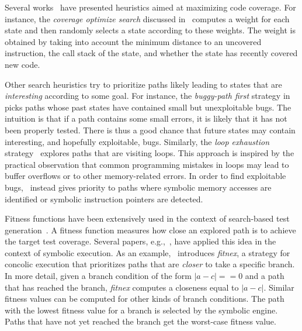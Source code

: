 Several works~\cite{EXE-CCS06,KLEE-OSDI08,MAYHEM-SP12,CKC-TOCS12} have presented heuristics aimed at maximizing code coverage. For instance, the {\em coverage optimize search} discussed in~\cite{KLEE-OSDI08} computes a weight for each state and then randomly selects a state according to these weights. The weight is obtained by taking into account the minimum distance to an uncovered instruction, the call stack of the state, and whether the state has recently covered new code.

Other search heuristics try to prioritize paths likely leading to states that are {\em interesting} according to some goal. For instance, the {\em buggy-path first} strategy in~\cite{AEG-NDSS11} picks paths whose past states have contained small but unexploitable bugs. The intuition is that if a path contains some small errors, it is likely that it has not been properly tested. There is thus a good chance that future states may contain interesting, and hopefully exploitable, bugs. Similarly, the {\em loop exhaustion} strategy~\cite{AEG-NDSS11} explores paths that are visiting loops. This approach is inspired by the practical observation that common programming mistakes in loops may lead to buffer overflows or to other memory-related errors. In order to find exploitable bugs,~\cite{MAYHEM-SP12} instead gives priority to paths where symbolic memory accesses are identified or symbolic instruction pointers are detected. 

Fitness functions have been extensively used in the context of search-based test generation~\cite{M-STVR04}. A fitness function measures how close an explored path is to achieve the target test coverage. Several papers, e.g.,~\cite{XTD-DSN09,CS-CACM13,XTD-DSN09}, have applied this idea in the context of symbolic execution. As an example,~\cite{XTD-DSN09} introduces {\em fitnex}, a strategy for concolic execution that prioritizes paths that are {\em closer} to take a specific branch. In more detail, given a branch condition of the form $|a - c| == 0$ and a path that has reached the branch, {\em fitnex} computes a closeness equal to $|a - c|$. Similar fitness values can be computed for other kinds of branch conditions. The path with the lowest fitness value for a branch is selected by the symbolic engine. Paths that have not yet reached the branch get the worst-case fitness value.

